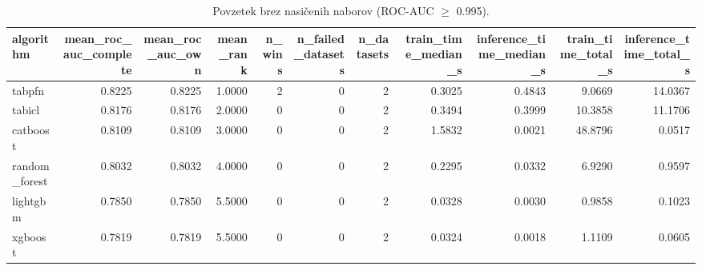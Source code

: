 \begin{table}[htbp]
\centering
\caption{Povzetek brez nasičenih naborov (ROC-AUC $\geq$ 0.995).}
\label{tab:overall-nonsat}
\begin{tabular}{lrrrrrrrrrr}
\hline
algorithm & mean\_roc\_auc\_complete & mean\_roc\_auc\_own & mean\_rank & n\_wins & n\_failed\_datasets & n\_datasets & train\_time\_median\_s & inference\_time\_median\_s & train\_time\_total\_s & inference\_time\_total\_s \\
\hline
tabpfn & 0.8225 & 0.8225 & 1.0000 & 2 & 0 & 2 & 0.3025 & 0.4843 & 9.0669 & 14.0367 \\
tabicl & 0.8176 & 0.8176 & 2.0000 & 0 & 0 & 2 & 0.3494 & 0.3999 & 10.3858 & 11.1706 \\
catboost & 0.8109 & 0.8109 & 3.0000 & 0 & 0 & 2 & 1.5832 & 0.0021 & 48.8796 & 0.0517 \\
random\_forest & 0.8032 & 0.8032 & 4.0000 & 0 & 0 & 2 & 0.2295 & 0.0332 & 6.9290 & 0.9597 \\
lightgbm & 0.7850 & 0.7850 & 5.5000 & 0 & 0 & 2 & 0.0328 & 0.0030 & 0.9858 & 0.1023 \\
xgboost & 0.7819 & 0.7819 & 5.5000 & 0 & 0 & 2 & 0.0324 & 0.0018 & 1.1109 & 0.0605 \\
\hline
\end{tabular}
\end{table}
